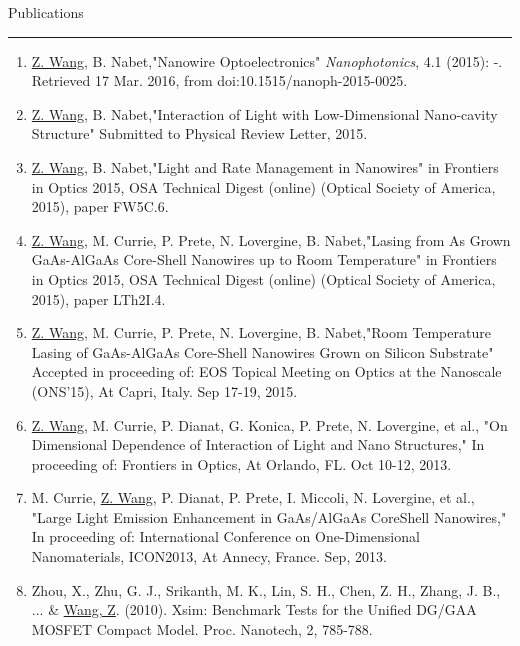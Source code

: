 \begin{vita}
{\Large\scshape\raggedright{Publications}}
\newline
\rule{\textwidth}{1pt}
\begin{enumerate}
\item \underline{Z. Wang}, B. Nabet,"Nanowire Optoelectronics" \emph{Nanophotonics}, 4.1 (2015): -. Retrieved 17 Mar. 2016, from doi:10.1515/nanoph-2015-0025.
\item \underline{Z. Wang}, B. Nabet,"Interaction of Light with Low-Dimensional Nano-cavity Structure" Submitted to Physical Review Letter, 2015.
\item \underline{Z. Wang}, B. Nabet,"Light and Rate Management in Nanowires" in Frontiers in Optics 2015, OSA Technical Digest (online) (Optical Society of America, 2015), paper FW5C.6.
\item \underline{Z. Wang}, M. Currie,  P. Prete, N. Lovergine, B. Nabet,"Lasing from As Grown GaAs-AlGaAs Core-Shell Nanowires up to Room Temperature" in Frontiers in Optics 2015, OSA Technical Digest (online) (Optical Society of America, 2015), paper LTh2I.4.
\item \underline{Z. Wang}, M. Currie, P. Prete, N. Lovergine, B. Nabet,"Room Temperature Lasing of GaAs-AlGaAs Core-Shell Nanowires Grown on Silicon Substrate" Accepted in proceeding of:  EOS Topical Meeting on Optics at the Nanoscale  (ONS’15), At Capri, Italy. Sep 17-19, 2015.
\item \underline{Z. Wang}, M. Currie, P. Dianat, G. Konica, P. Prete, N. Lovergine, et al., "On Dimensional Dependence of Interaction of Light and Nano Structures," In proceeding of: Frontiers in Optics, At Orlando, FL. Oct 10-12, 2013.
\item M. Currie, \underline{Z. Wang}, P. Dianat, P. Prete, I. Miccoli, N. Lovergine, et al., "Large Light Emission Enhancement in GaAs/AlGaAs CoreShell Nanowires," In proceeding of: International Conference on One-Dimensional Nanomaterials, ICON2013, At Annecy, France. Sep, 2013.
\item Zhou, X., Zhu, G. J., Srikanth, M. K., Lin, S. H., Chen, Z. H., Zhang, J. B., ... \& \underline{Wang, Z}. (2010). Xsim: Benchmark Tests for the Unified DG/GAA MOSFET Compact Model. Proc. Nanotech, 2, 785-788.
\end{enumerate}


\end{vita}
